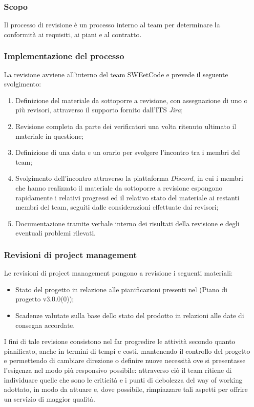 \documentclass[10pt, a4paper]{article}
\begin{document}
\subsubsection{Scopo}
Il processo di revisione è un processo interno al team per determinare la conformità ai requisiti, ai piani e al contratto.

\subsubsection{Implementazione del processo}
La revisione avviene all'interno del team SWEetCode e prevede il seguente svolgimento:
\begin{enumerate}
    \item Definizione del materiale da sottoporre a revisione, con assegnazione di uno o più revisori, attraverso il supporto fornito dall'ITS \textit{Jira};
    \item Revisione completa da parte dei verificatori una volta ritenuto ultimato il materiale in questione;
    \item Definizione di una data e un orario per svolgere l'incontro tra i membri del team;
    \item Svolgimento dell'incontro attraverso la piattaforma \textit{Discord\pg}, in cui i membri che hanno realizzato il materiale da sottoporre a revisione espongono rapidamente 
    i relativi progressi ed il relativo stato del materiale ai restanti membri del team, seguiti dalle considerazioni effettuate dai revisori;
    \item Documentazione tramite verbale interno dei risultati della revisione e degli eventuali problemi rilevati.
\end{enumerate}

\subsubsection{Revisioni di project management}
Le revisioni di project management pongono a revisione i seguenti materiali:
\begin{itemize}
    \item Stato del progetto in relazione alle pianificazioni presenti nel (Piano di progetto v3.0.0(0));
    \item Scadenze valutate sulla base dello stato del prodotto in relazioni alle date di consegna accordate.
\end{itemize}
I fini di tale revisione consistono nel far progredire le attività secondo quanto pianificato, anche in termini di tempi e costi, mantenendo il controllo del progetto e 
permettendo di cambiare direzione o definire nuove necessità ove si presentasse l'esigenza nel modo più responsivo possibile: attraverso ciò il team
ritiene di individuare quelle che sono le criticità e i punti di debolezza del way of working adottato, in modo da attuare e, dove possibile, rimpiazzare
tali aspetti per offrire un servizio di maggior qualità.
\end{document}
